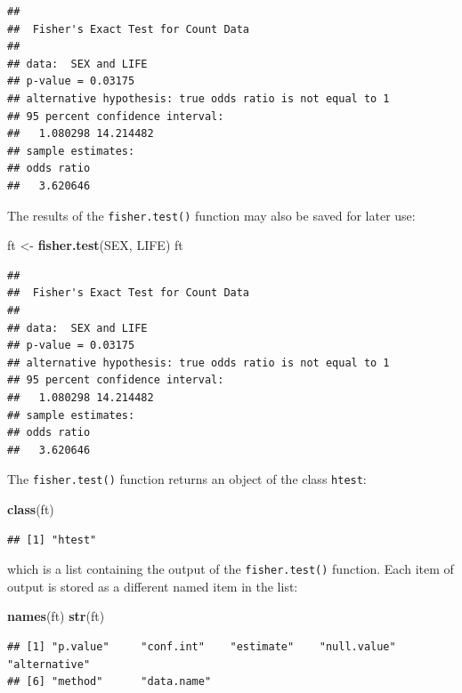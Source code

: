 \documentclass[12pt,a4paper]{book}
\newenvironment{Shaded}{\begin{snugshade}}{\end{snugshade}}
\newcommand{\KeywordTok}[1]{\textcolor[rgb]{0.13,0.29,0.53}{\textbf{#1}}}
\newcommand{\NormalTok}[1]{#1}
\newcommand{\StringTok}[1]{\textcolor[rgb]{0.31,0.60,0.02}{#1}}
\theoremstyle{definition}
\theoremstyle{definition}
\theoremstyle{definition}
\theoremstyle{remark}
\begin{document}
\begin{verbatim}
## 
##  Fisher's Exact Test for Count Data
## 
## data:  SEX and LIFE
## p-value = 0.03175
## alternative hypothesis: true odds ratio is not equal to 1
## 95 percent confidence interval:
##   1.080298 14.214482
## sample estimates:
## odds ratio 
##   3.620646
\end{verbatim}

The results of the \texttt{fisher.test()} function may also be saved for
later use:

\begin{Shaded}
\begin{Highlighting}[]
\NormalTok{ft <-}\StringTok{ }\KeywordTok{fisher.test}\NormalTok{(SEX, LIFE)}
\NormalTok{ft}
\end{Highlighting}
\end{Shaded}

\begin{verbatim}
## 
##  Fisher's Exact Test for Count Data
## 
## data:  SEX and LIFE
## p-value = 0.03175
## alternative hypothesis: true odds ratio is not equal to 1
## 95 percent confidence interval:
##   1.080298 14.214482
## sample estimates:
## odds ratio 
##   3.620646
\end{verbatim}

The \texttt{fisher.test()} function returns an object of the class
\texttt{htest}:

\begin{Shaded}
\begin{Highlighting}[]
\KeywordTok{class}\NormalTok{(ft)}
\end{Highlighting}
\end{Shaded}

\begin{verbatim}
## [1] "htest"
\end{verbatim}

which is a list containing the output of the \texttt{fisher.test()}
function. Each item of output is stored as a different named item in the
list:

\begin{Shaded}
\begin{Highlighting}[]
\KeywordTok{names}\NormalTok{(ft)}
\KeywordTok{str}\NormalTok{(ft)}
\end{Highlighting}
\end{Shaded}

\begin{verbatim}
## [1] "p.value"     "conf.int"    "estimate"    "null.value"  "alternative"
## [6] "method"      "data.name"
\end{verbatim}
\end{document}
